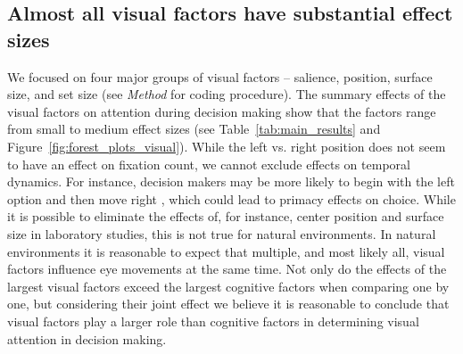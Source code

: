 \subsection{Almost all visual factors have substantial effect sizes}

We focused on four major groups of visual factors -- salience, position, surface size, and set size (see \textit{Method} for coding procedure). The summary effects of the visual factors on attention during decision making show that the factors range from small to medium effect sizes (see Table~\ref{tab:main_results} and Figure~\ref{fig:forest_plots_visual}).  While the left vs. right position does not seem to have an effect on fixation count, we cannot exclude effects on temporal dynamics. For instance, decision makers may be more likely to begin with the left option and then move right \citep{fiedler2012}, which could lead to primacy effects on choice.  While it is possible to eliminate the effects of, for instance, center position and surface size in laboratory studies, this is not true for natural environments. In natural environments it is reasonable to expect that multiple, and most likely all, visual factors influence eye movements at the same time. Not only do the effects of the largest visual factors exceed the largest cognitive factors when comparing one by one, but considering their joint effect we believe it is reasonable to conclude that visual factors play a larger role than cognitive factors in determining visual attention in decision making. 


